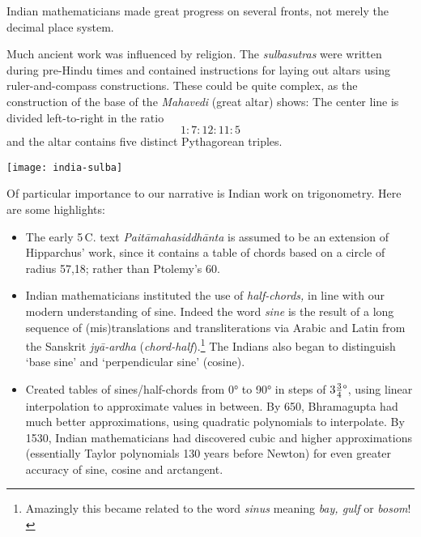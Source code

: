 \label{pg:Mahavedi}

Indian mathematicians made great progress on several fronts, not merely the decimal place system.\par
\begin{minipage}[t]{0.55\linewidth}\vspace{0pt}
Much ancient work was influenced by religion. The \emph{sulbasutras} were written during pre-Hindu times and contained instructions for laying out altars using ruler-and-compass constructions. These could be quite complex, as the construction of the base of the \emph{Mahavedi} (great altar) shows: The center line is divided left-to-right in the ratio
\[1:7:12:11:5\]
and the altar contains five distinct Pythagorean triples.
\end{minipage}\hfill
\begin{minipage}[t]{0.42\linewidth}\vspace{0pt}
\flushright\texttt{[image: india-sulba]}
\end{minipage}\medbreak

Of particular importance to our narrative is Indian work on trigonometry. Here are some highlights:
\begin{itemize}
  \item The early 5\th\,C.{} text \emph{Paitāmahasiddhānta} is assumed to be an extension of Hipparchus' work, since it contains a table of chords based on a circle of radius 57,18; rather than Ptolemy's 60.
  \item Indian mathematicians instituted the use of \emph{half-chords,} in line with our modern understanding of sine. Indeed the word \emph{sine} is the result of a long sequence of (mis)translations and transliterations via Arabic and Latin from the Sanskrit \emph{jyā-ardha} (\emph{chord-half}).\footnote{Amazingly this became related to the word \emph{sinus} meaning \emph{bay, gulf} or \emph{bosom}!} The Indians also began to distinguish `base sine' and `perpendicular sine' (cosine).
  \item Created tables of sines/half-chords from \ang{0} to \ang{90} in steps of $\ang{3\frac 34}$, using linear interpolation to approximate values in between. By 650, Bhramagupta had much better approximations, using quadratic polynomials to interpolate. By 1530, Indian mathematicians had discovered cubic and higher approximations (essentially Taylor polynomials 130 years before Newton) for even greater accuracy of sine, cosine and arctangent.
\end{itemize}

